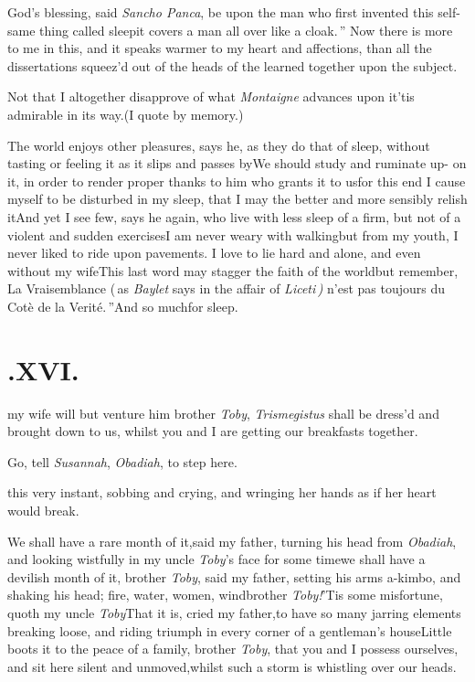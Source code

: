 \documentclass[twoside]{article}
\begin{document}
\tsk\lqq God’s blessing, said \textit{Sancho Panca},\break
\lqq be upon the man who first invented\break
\lqq this self-same thing called sleep\tsk it\break
\lqq covers a man all over like a cloak.\,”\break
Now there is more to me in this, and it speaks warmer to my
heart and affections, than all the dissertations squeez’d out
of the heads of the learned together upon the subject.

\tsk Not that I altogether disapprove of what \textit{Montaigne} advances upon
it\tsk ’tis admirable in its way.\tsk (I quote by
memory.)

The world enjoys other pleasures, says
he, as they do that of sleep, without\break
tasting or feeling it as it slips and passes\break
by\tsk We should study and ruminate up-\break 
on it, in order to render proper thanks\break
to him who grants it to us\tsk for this end
I cause myself to be disturbed in my sleep, that I may the better and
more sensibly relish it\tsk And yet I see few, says he
again, who live with less sleep\break
{}\break
of a firm, but not of a violent and sudden
\break
exercises\tsk I am never weary with
walking\tsk but from my youth, I never liked to ride upon
pavements. I love to lie hard and alone, and even without my
wife\tsk This last word may stagger the faith of the
world\tsk but remember, \lqq La\break
\lqq Vraisemblance (\,as \textit{Baylet} says in the\break
\lqq affair of \textit{Liceti\,)\sic} n’est pas toujours
\lqq du Cotè de la Verité.\,”\quad And so much\break for sleep.

\bigskip
\section{.\enspace XVI.}

 my wife will but venture him\tsk 
brother \textit{Toby}, \textit{Trismegistus} shall be\break
dress’d and brought down to us, whilst\break 
you and I are getting our breakfasts\break
together.\tsk

\tsk Go, tell \textit{Susannah}, \textit{Obadiah}, to step
here.

\break
this very instant, sobbing and crying,\break
and wringing her hands as if her heart\break
would break.\tsh{}

We shall have a rare month of it,\break said my father, turning his
head from \textit{Obadiah}, and looking wistfully in my uncle
\textit{Toby}’s face for some time\tsk we shall have a
devilish month of it, brother \textit{Toby}, said my father, setting
his arms a-kimbo, and shaking his head; fire, water, wo\-men,
wind\tsk brother \textit{Toby!}\tsk ’Tis some misfortune,
quoth my uncle \textit{Toby}\tsk That it is, cried my
father,\tsk to have so many jarring elements breaking loose, and
riding triumph in every corner of a gentleman’s house\tsk Little boots it to the peace
of a family, brother \textit{Toby}, that you and I possess ourselves,
and sit here silent and unmoved,\tsk whilst such a storm is
whistling over our heads.\tsh
\end{document}
